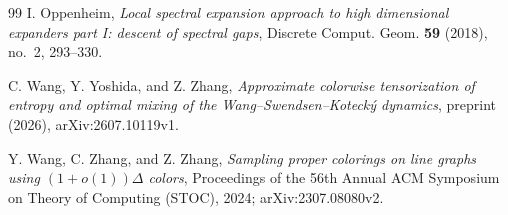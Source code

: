 \documentclass{amsart}
\numberwithin{equation}{section}
\theoremstyle{plain}
\theoremstyle{definition}
\theoremstyle{remark}
\begin{document}
\begin{thebibliography}{99}
I. Oppenheim, \emph{Local spectral expansion approach to high dimensional expanders part I: descent of spectral gaps}, Discrete Comput. Geom. \textbf{59} (2018), no.~2, 293--330.

C. Wang, Y. Yoshida, and Z. Zhang, \emph{Approximate colorwise tensorization of entropy and optimal mixing of the Wang--Swendsen--Koteck\'y dynamics}, preprint (2026), arXiv:2607.10119v1.

Y. Wang, C. Zhang, and Z. Zhang, \emph{Sampling proper colorings on line graphs using $(1+o(1))\Delta$ colors}, Proceedings of the 56th Annual ACM Symposium on Theory of Computing (STOC), 2024; arXiv:2307.08080v2.

\end{thebibliography}
\end{document}
